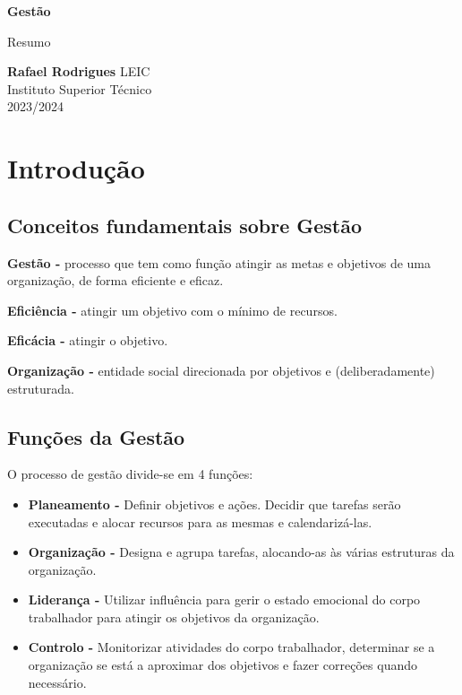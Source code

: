 \documentclass[11pt]{article}
\begin{document}
\begin{titlepage}
    \begin{center}
        \vspace*{1cm}

        \textbf{\LARGE Gestão}
        \vspace{0.5cm}

        \Large Resumo
        \vspace{1.5cm}

        \textbf{Rafael Rodrigues}
        \vfill
        LEIC \\
        Instituto Superior Técnico \\
        2023/2024
    \end{center}
\end{titlepage}

\tableofcontents

\newpage

\section{Introdução}

\subsection{Conceitos fundamentais sobre Gestão}

\textbf{Gestão -} processo que tem como função atingir as metas e objetivos de uma organização, de forma eficiente e eficaz. 

\textbf{Eficiência -} atingir um objetivo com o mínimo de recursos. 

\textbf{Eficácia -} atingir o objetivo.

\textbf{Organização -} entidade social direcionada por objetivos e (deliberadamente) estruturada.

\subsection{Funções da Gestão}

O processo de gestão divide-se em 4 funções:
\begin{itemize}[topsep=0pt]
    \item \textbf{Planeamento -} Definir objetivos e ações. Decidir que tarefas serão executadas e alocar recursos para as mesmas e calendarizá-las.
    \item \textbf{Organização -} Designa e agrupa tarefas, alocando-as às várias estruturas da organização.
    \item \textbf{Liderança -} Utilizar influência para gerir o estado emocional do corpo trabalhador para atingir os objetivos da organização.
    \item \textbf{Controlo -} Monitorizar atividades do corpo trabalhador, determinar se a organização se está a aproximar dos objetivos e fazer correções quando necessário.
\end{itemize}
\end{document}
